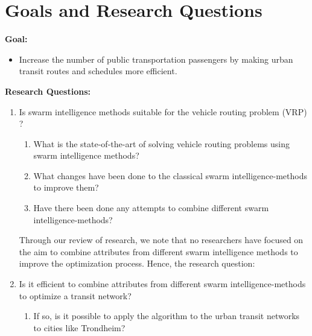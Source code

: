 \section{Goals and Research Questions}
\textbf{Goal:}
\begin{itemize}
\item Increase the number of public transportation passengers by making urban transit routes and schedules more efficient.
\end{itemize}
\textbf{Research Questions:}
\begin{enumerate}
  \item Is swarm intelligence methods suitable for the vehicle routing problem (VRP) ?
    \begin{enumerate}
    \item What is the state-of-the-art of solving vehicle routing problems using swarm intelligence methods?
    \item What changes have been done to the classical swarm intelligence-methods to improve them?
    \item Have there been done any attempts to combine different swarm intelligence-methods?
  \end{enumerate}

Through our review of research, we note that no researchers have focused on the aim to combine attributes from different swarm intelligence methods to improve the optimization process. Hence, the research question:

\item Is it efficient to combine attributes from different swarm intelligence-methods to optimize a transit network?
    \begin{enumerate}
    \item If so, is it possible to apply the algorithm to the urban transit networks to cities like Trondheim?
  \end{enumerate}
\end{enumerate}